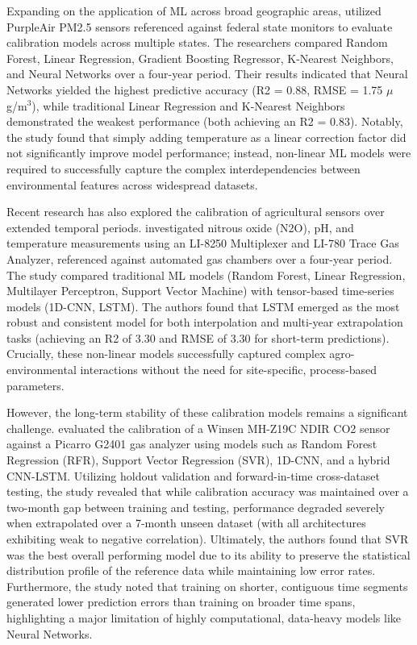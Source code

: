 Expanding on the application of ML across broad geographic areas, \cite{Yaqoob_October2024} utilized PurpleAir PM2.5 sensors referenced against federal state monitors to evaluate calibration models across multiple states. The researchers compared Random Forest, Linear Regression, Gradient Boosting Regressor, K-Nearest Neighbors, and Neural Networks over a four-year period. Their results indicated that Neural Networks yielded the highest predictive accuracy (R2 = 0.88, RMSE = 1.75 $\mu$g/m$^3$), while traditional Linear Regression and K-Nearest Neighbors demonstrated the weakest performance (both achieving an R2 = 0.83). Notably, the study found that simply adding temperature as a linear correction factor did not significantly improve model performance; instead, non-linear ML models were required to successfully capture the complex interdependencies between environmental features across widespread datasets. 

Recent research has also explored the calibration of agricultural sensors over extended temporal periods. \cite{Killeen_March2026} investigated nitrous oxide (N2O), pH, and temperature measurements using an LI-8250 Multiplexer and LI-780 Trace Gas Analyzer, referenced against automated gas chambers over a four-year period. The study compared traditional ML models (Random Forest, Linear Regression, Multilayer Perceptron, Support Vector Machine) with tensor-based time-series models (1D-CNN, LSTM). The authors found that LSTM emerged as the most robust and consistent model for both interpolation and multi-year extrapolation tasks (achieving an R2 of 3.30 and RMSE of 3.30 for short-term predictions). Crucially, these non-linear models successfully captured complex agro-environmental interactions without the need for site-specific, process-based parameters. 

However, the long-term stability of these calibration models remains a significant challenge. \cite{Barrett_March2025} evaluated the calibration of a Winsen MH-Z19C NDIR CO2 sensor against a Picarro G2401 gas analyzer using models such as Random Forest Regression (RFR), Support Vector Regression (SVR), 1D-CNN, and a hybrid CNN-LSTM. Utilizing holdout validation and forward-in-time cross-dataset testing, the study revealed that while calibration accuracy was maintained over a two-month gap between training and testing, performance degraded severely when extrapolated over a 7-month unseen dataset (with all architectures exhibiting weak to negative correlation). Ultimately, the authors found that SVR was the best overall performing model due to its ability to preserve the statistical distribution profile of the reference data while maintaining low error rates. Furthermore, the study noted that training on shorter, contiguous time segments generated lower prediction errors than training on broader time spans, highlighting a major limitation of highly computational, data-heavy models like Neural Networks.

